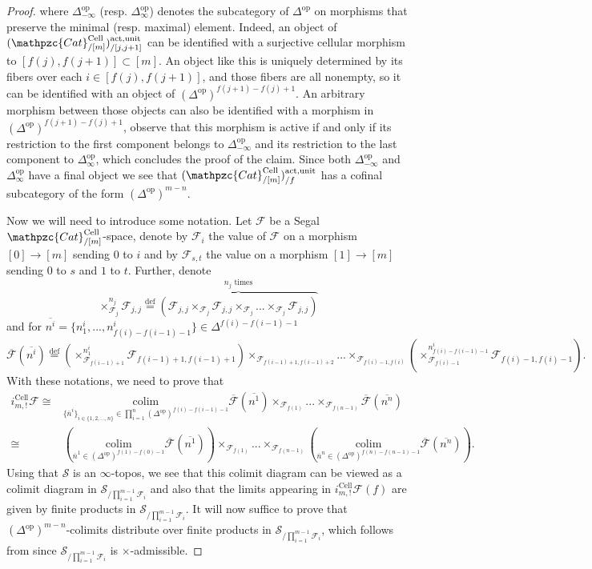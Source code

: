 \documentclass[a4paper, reqno]{amsart}
\theoremstyle{definition}
\newcommand\cF{\mathscr F}
\newcommand\cS{\mathscr S}
\newcommand\op{\mathrm{op}}
\newcommand\ccat{\mathpzc{Cat}}
\newcommand\colim{\mathrm{colim}}
\newcommand\bydef{\overset{\mathrm{def}}{=}}
\newcommand\cell{\mathrm{Cell}}
\newcommand\un{\mathrm{unit}}
\newcommand\act{\mathrm{act}}
\begin{document}
\begin{proof}
where $\Delta^\op_{-\infty}$ (resp. $\Delta^\op_{\infty}$) denotes the subcategory of $\Delta^\op$ on morphisms that preserve the minimal (resp. maximal) element. Indeed, an object of $(\ccat^\cell_{/[m]})^{\act,\un}_{/[j,j+1]}$ can be identified with a surjective cellular morphism to $[f(j),f(j+1)]\subset[m]$. An object like this is uniquely determined by its fibers over each $i\in[f(j),f(j+1)]$, and those fibers are all nonempty, so it can be identified with an object of $(\Delta^\op)^{f(j+1)-f(j)+1}$. An arbitrary morphism between those objects can also be identified with a morphism in $(\Delta^\op)^{f(j+1)-f(j)+1}$, observe that this morphism is active if and only if its restriction to the first component belongs to $\Delta^\op_{-\infty}$ and its restriction to the last component to $\Delta^\op_{\infty}$, which concludes the proof of the claim. Since both $\Delta^\op_{-\infty}$ and $\Delta^\op_{\infty}$ have a final object we see that $(\ccat^\cell_{/[m]})^{\act,\un}_{/f}$ has a cofinal subcategory of the form $(\Delta^\op)^{m-n}$.\par
Now we will need to introduce some notation. Let $\cF$ be a Segal $\ccat^\cell_{/[m]}$-space, denote by $\cF_i$ the value of $\cF$ on a morphism $[0]\rightarrow[m]$ sending $0$ to $i$ and by $\cF_{s,t}$ the value on a morphism $[1]\rightarrow[m]$ sending $0$ to $s$ and $1$ to $t$. Further, denote 
\[\mathop \times_{\cF_j}^{n_j}\cF_{j,j}\bydef \overbrace{(\cF_{j,j}\times_{\cF_j}\cF_{j,j}\times_{\cF_j}...\times_{\cF_j}\cF_{j,j})}^\text{$n_j$ times}\]
and for $\overline{n^i}=\{n^i_1,...,n^i_{f(i)-f(i-1)-1}\}\in\Delta^{f(i)-f(i-1)-1}$
\[\overline{\cF}(\overline{n^i})\bydef (\mathop \times_{\cF_{f(i-1)+1}}^{n^i_1}\cF_{f(i-1)+1,f(i-1)+1})\times_{\cF_{f(i-1)+1,f(i-1)+2}}...\times_{\cF_{f(i)-1,f(i)}}(\mathop \times_{\cF_{f(i)-1}}^{n^i_{f(i)-f(i-1)-1}}\cF_{f(i)-1,f(i)-1}).\]
With these notations, we need to prove that
\begin{align*}
    i^\cell_{m,!}\cF\cong &\underset{\{\overline{n}^i\}_{i\in\{1,2,...,n\}}\in\prod_{i=1}^n (\Delta^\op)^{f(i)-f(i-1)-1}}{\colim}\overline{\cF}(\overline{n^1})\times_{\cF_{f(1)}}...\times_{\cF_{f(n-1)}}\overline{\cF}(\overline{n^n})\\
    \cong& (\underset{\overline{n}^1\in(\Delta^\op)^{f(1)-f(0)-1}}{\colim}\overline{\cF}(\overline{n^1}))\times_{\cF_{f(1)}}...\times_{\cF_{f(n-1)}}(\underset{\overline{n}^n\in(\Delta^\op)^{f(n)-f(n-1)-1}}{\colim}\overline{\cF}(\overline{n^n})).
\end{align*}
Using that $\cS$ is an $\infty$-topos, we see that this colimit diagram can be viewed as a colimit diagram in $\cS_{/\prod_{i=1}^{m-1}\cF_i}$ and also that the limits appearing in $i^\cell_{m,!}\cF(f)$ are given by finite products in $\cS_{/\prod_{i=1}^{m-1}\cF_i}$. It will now suffice to prove that $(\Delta^\op)^{m-n}$-colimits distribute over finite products in $\cS_{/\prod_{i=1}^{m-1}\cF_i}$, which follows from \cite[Lemma 7.15]{chu2019homotopy} since $\cS_{/\prod_{i=1}^{m-1}\cF_i}$ is $\times$-admissible.
\end{proof}
\end{document}
